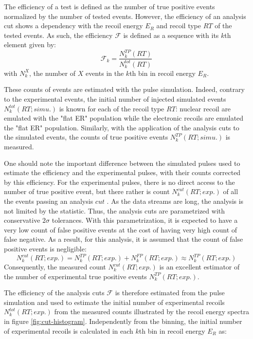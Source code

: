 The efficiency of a test is defined as the number of true positive events normalized by the number of tested events. However, the efficiency of an analysis cut shows a dependency with the recoil energy $E_R$ and recoil type $RT$ of the tested events. As such, the efficiency $\mathcal{F}$ is defined as a sequence with its $k$th element given by:
\begin{equation}
\mathcal{F}_k
=
\frac{ N_k^{TP} (RT)}{ N_k^{tot} (RT)}
\end{equation}
with $N_k^X$, the number of $X$ events in the $k$th bin in recoil energy $E_R$. 

These counts of events are estimated with the pulse simulation. Indeed, contrary to the experimental events, the initial number of injected simulated events $N_k^{tot} (RT; simu.)$ is known for each of the recoil type $RT$: nuclear recoil are emulated with the "flat ER" population while the electronic recoils are emulated the "flat ER" population. Similarly, with the application of the analysis cuts to the simulated events, the counts of true positive events $N_k^{TP} (RT; simu.)$ is measured.

One should note the important difference between the simulated pulses used to estimate the efficiency and the experimental pulses, with their counts corrected by this efficiency. For the experimental pulses, there is no direct access to the number of true positive event, but there rather is count $N_k^{cut} (RT; exp.)$ of all the events passing an analysis $cut$ . As the data streams are long, the analysis is not limited by the statistic. Thus, the analysis cuts are parametrized with conservative $2\sigma$ tolerances.  With this parametrization, it is expected to have a very low count of false positive events at the cost of having very high count of false negative. As a result, for this analysis, it is assumed that the count of false positive events is negligible:
\begin{equation}
N_k^{cut} (RT; exp.) = N_k^{TP} (RT; exp.) + N_k^{FP} (RT; exp.) \approx N_k^{TP} (RT; exp.)
\end{equation}
Consequently, the measured count $N_k^{cut} (RT; exp.)$ is an excellent estimator of the number of experimental true positive events $N_k^{TP} (RT; exp.)$.

The efficiency of the analysis cuts $\mathcal{F}$ is therefore estimated from the pulse simulation and used to estimate the initial number of experimental recoils $N_k^{tot} (RT; exp.)$ from the measured counts illustrated by the recoil energy spectra in figure \ref{fig:cut-histogram}. Independently from the binning, the initial number of experimental recoils is calculated in each $k$th bin in recoil energy $E_R$ as:

